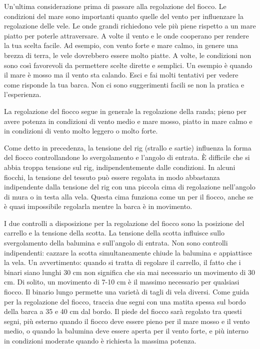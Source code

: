 Un'ultima considerazione prima di passare alla regolazione del fiocco. Le
condizioni del mare sono importanti quanto quelle del vento per influenzare la
regolazione delle vele. Le onde grandi richiedono vele più piene rispetto a un
mare piatto per poterle attraversare. A volte il vento e le onde cooperano per
rendere la tua scelta facile. Ad esempio, con vento forte e mare calmo, in
genere una brezza di terra, le vele dovrebbero essere molto piatte. A volte, le
condizioni non sono così favorevoli da permettere scelte dirette e semplici. Un
esempio è quando il mare è mosso ma il vento sta calando. Esci e fai molti tentativi per
vedere come risponde la tua barca. Non ci sono suggerimenti facili se non la
pratica e l'esperienza.

La regolazione del fiocco segue in generale la
regolazione della randa; pieno per avere potenza in condizioni di vento medio e
mare mosso, piatto in mare calmo e in condizioni di vento molto leggero o molto forte.

Come detto in precedenza, la tensione del rig (strallo e sartie) influenza la
forma del fiocco controllandone lo svergolamento e l'angolo di entrata. È
difficile che si abbia troppa tensione sul rig, indipendentemente dalle condizioni. In
alcuni fiocchi, la tensione del tessuto può essere regolata in modo abbastanza
indipendente dalla tensione del rig con una piccola cima di regolazione
nell'angolo di mura o in testa alla vela. Questa cima funziona come un
\cunningham per il fiocco, anche se è quasi impossibile regolarla mentre la barca
è in movimento.

I due controlli a disposizione per la regolazione del fiocco sono la posizione
del carrello e la tensione della scotta. La tensione della scotta influisce
sullo svergolamento della balumina e sull'angolo di entrata. Non sono controlli
indipendenti: cazzare la scotta simultaneamente chiude la balumina e appiattisce
la vela. Un avvertimento: quando si tratta di regolare il carrello, il fatto che
i binari siano lunghi 30 cm non significa che sia mai necessario un movimento di
30 cm. Di solito, un movimento di 7-10 cm è il massimo necessario per qualsiasi
fiocco. Il binario lungo permette una varietà di tagli di vela diversi. Come
guida per la regolazione del fiocco, traccia due segni con una matita spessa sul
bordo della barca a 35 e 40 cm dal bordo. Il piede del fiocco sarà regolato tra
questi segni, più esterno quando il fiocco deve essere pieno per il mare mosso e
il vento medio, o quando la balumina deve essere aperta per il vento forte, e
più interno in condizioni moderate quando è richiesta la massima potenza. 

